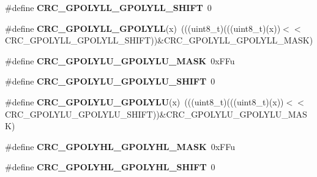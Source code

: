 \begin{DoxyCompactItemize}
\item 
\#define {\bfseries C\+R\+C\+\_\+\+G\+P\+O\+L\+Y\+L\+L\+\_\+\+G\+P\+O\+L\+Y\+L\+L\+\_\+\+S\+H\+I\+FT}~0\hypertarget{group__CRC__Register__Masks_ga1a323693acd9a37bb90abdc7f16ebbd8}{}\label{group__CRC__Register__Masks_ga1a323693acd9a37bb90abdc7f16ebbd8}

\item 
\#define {\bfseries C\+R\+C\+\_\+\+G\+P\+O\+L\+Y\+L\+L\+\_\+\+G\+P\+O\+L\+Y\+LL}(x)~(((uint8\+\_\+t)(((uint8\+\_\+t)(x))$<$$<$C\+R\+C\+\_\+\+G\+P\+O\+L\+Y\+L\+L\+\_\+\+G\+P\+O\+L\+Y\+L\+L\+\_\+\+S\+H\+I\+FT))\&C\+R\+C\+\_\+\+G\+P\+O\+L\+Y\+L\+L\+\_\+\+G\+P\+O\+L\+Y\+L\+L\+\_\+\+M\+A\+SK)\hypertarget{group__CRC__Register__Masks_gafd454535299300522b0dfe8b5c46b4c4}{}\label{group__CRC__Register__Masks_gafd454535299300522b0dfe8b5c46b4c4}

\item 
\#define {\bfseries C\+R\+C\+\_\+\+G\+P\+O\+L\+Y\+L\+U\+\_\+\+G\+P\+O\+L\+Y\+L\+U\+\_\+\+M\+A\+SK}~0x\+F\+Fu\hypertarget{group__CRC__Register__Masks_gaf2e9b900f7d964512e1541299729abb9}{}\label{group__CRC__Register__Masks_gaf2e9b900f7d964512e1541299729abb9}

\item 
\#define {\bfseries C\+R\+C\+\_\+\+G\+P\+O\+L\+Y\+L\+U\+\_\+\+G\+P\+O\+L\+Y\+L\+U\+\_\+\+S\+H\+I\+FT}~0\hypertarget{group__CRC__Register__Masks_ga4d6303422fb112dfad558ee2f84aa92c}{}\label{group__CRC__Register__Masks_ga4d6303422fb112dfad558ee2f84aa92c}

\item 
\#define {\bfseries C\+R\+C\+\_\+\+G\+P\+O\+L\+Y\+L\+U\+\_\+\+G\+P\+O\+L\+Y\+LU}(x)~(((uint8\+\_\+t)(((uint8\+\_\+t)(x))$<$$<$C\+R\+C\+\_\+\+G\+P\+O\+L\+Y\+L\+U\+\_\+\+G\+P\+O\+L\+Y\+L\+U\+\_\+\+S\+H\+I\+FT))\&C\+R\+C\+\_\+\+G\+P\+O\+L\+Y\+L\+U\+\_\+\+G\+P\+O\+L\+Y\+L\+U\+\_\+\+M\+A\+SK)\hypertarget{group__CRC__Register__Masks_ga0e683f5350c138559c8f6c72771610f9}{}\label{group__CRC__Register__Masks_ga0e683f5350c138559c8f6c72771610f9}

\item 
\#define {\bfseries C\+R\+C\+\_\+\+G\+P\+O\+L\+Y\+H\+L\+\_\+\+G\+P\+O\+L\+Y\+H\+L\+\_\+\+M\+A\+SK}~0x\+F\+Fu\hypertarget{group__CRC__Register__Masks_ga92b941ef781b6023d61bc2af7f0b1818}{}\label{group__CRC__Register__Masks_ga92b941ef781b6023d61bc2af7f0b1818}

\item 
\#define {\bfseries C\+R\+C\+\_\+\+G\+P\+O\+L\+Y\+H\+L\+\_\+\+G\+P\+O\+L\+Y\+H\+L\+\_\+\+S\+H\+I\+FT}~0\hypertarget{group__CRC__Register__Masks_gaffbf0c35e87ea7a9650c9a049a08560c}{}\label{group__CRC__Register__Masks_gaffbf0c35e87ea7a9650c9a049a08560c}


\end{DoxyCompactItemize}
